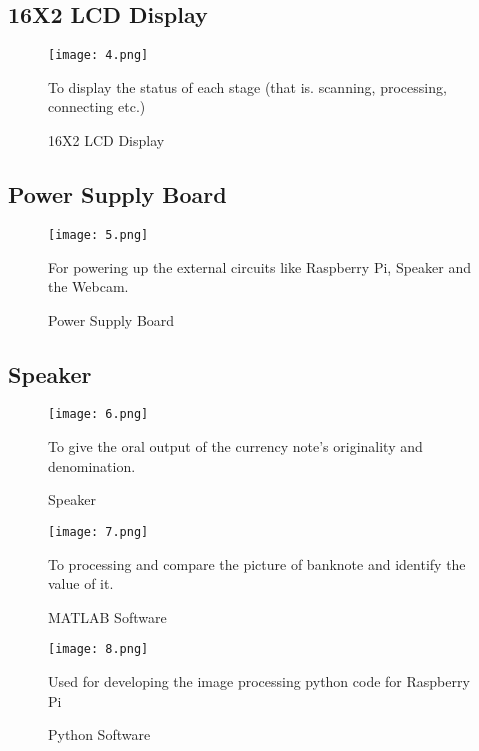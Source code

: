 \documentclass[a4paper,12pt]{report}
\begin{document}
 \subsection{16X2 LCD Display}
\begin{figure}[h]
	\centering
	\texttt{[image: 4.png]}
	\caption{\label{fig.4}16X2 LCD Display} 
	To  display  the  status of  each  stage  (that  is. scanning,  processing, connecting etc.)
\end{figure}
\subsection{Power Supply Board}
\begin{figure}[h]
	\centering
	\texttt{[image: 5.png]}
	\caption{\label{fig.5}Power Supply Board}
	For powering up the external circuits like Raspberry Pi, Speaker and the Webcam.
\end{figure} \clearpage
\subsection{Speaker}
\begin{figure}[h]
	\centering
	\texttt{[image: 6.png]}
	\caption{\label{fig.6}Speaker}
	To give the oral output of the currency note’s originality and denomination.
\end{figure}
\begin{figure}[h]
	\centering
	\texttt{[image: 7.png]}
	\caption{\label{fig.7}MATLAB Software}
	\large To processing and compare the picture of banknote and identify the value of it.
\end{figure} \clearpage
\begin{figure}[h] 
	\centering
	\texttt{[image: 8.png]}
	\caption{\label{fig.8}Python Software}
	\large Used for developing the image processing python code for Raspberry Pi
\end{figure}
\end{document}
